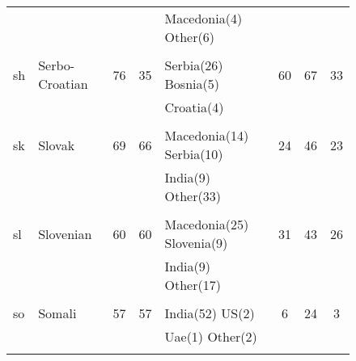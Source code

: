 \begin{figure}[h]
\begin{tabular}{llcclccc}
&&&&Macedonia(4) Other(6) &&&\\
&&&&&&&\\
sh&Serbo-Croatian&76&35&Serbia(26) Bosnia(5) &60&67&33\\
&&&&Croatia(4) &&&\\
&&&&&&&\\
sk&Slovak&69&66&Macedonia(14) Serbia(10) &24&46&23\\
&&&&India(9) Other(33) &&&\\
&&&&&&&\\
sl&Slovenian&60&60&Macedonia(25) Slovenia(9) &31&43&26\\
&&&&India(9) Other(17) &&&\\
&&&&&&&\\
so&Somali&57&57&India(52) US(2) &6&24&3\\
&&&&Uae(1) Other(2) &&&\\
&&&&&&&\\
\end{tabular}
\end{figure}
\clearpage

